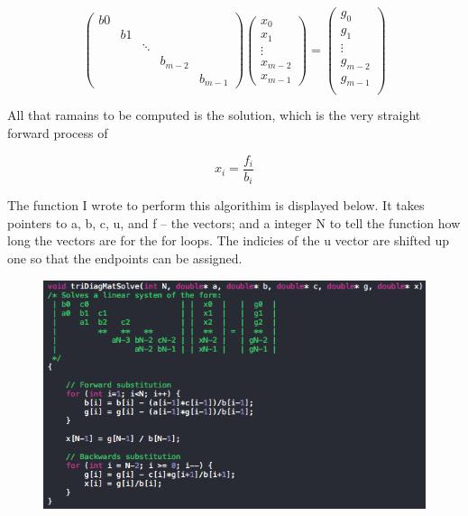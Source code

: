 \documentclass{article}
\begin{document}
\begin{equation}
\label{eqn: mat system}
\left( \begin{array}{ccccc}
    b0 &    &        &         &         \\
	   & b1 &        &         &         \\
	   &    & \ddots &         &         \\
	   &	    &        & b_{m-2} &         \\
	   &    &        &         & b_{m-1}
   \end{array} \right)
\left( \begin{array}{c}
	x_0     \\
	x_1     \\
	\vdots  \\
	x_{m-2} \\
	x_{m-1}
   \end{array} \right)
=
\left( \begin{array}{c}
	g_0     \\
	g_1     \\
	\vdots  \\
	g_{m-2} \\
	g_{m-1} \\
   \end{array} \right)
\end{equation}

All that ramains to be computed is the solution, which is the very straight forward process of

\begin{equation}
x_i = \frac{f_i}{b_i}
\end{equation}

The function I wrote to perform this algorithim is displayed below.  It takes pointers to a, b, c, u, and f -- the vectors; and a integer N to tell the function how long the vectors are for the for loops.  The indicies of the u vector are shifted up one so that the endpoints can be assigned.

\begin{figure}[H]
	\centering
	\includegraphics[width=0.8\linewidth]{cppThomasAlgorithm.png}
	\caption{}
\end{figure}
\end{document}

